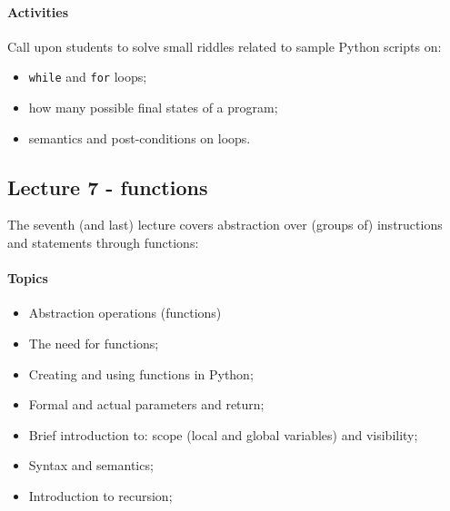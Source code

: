 				\paragraph*{Activities}
					Call upon students to solve small riddles related to sample Python scripts on:

					\begin{itemize}
						\item \texttt{while} and \texttt{for} loops;
						\item how many possible final states of a program;
						\item semantics and post-conditions on loops.
					\end{itemize}

			\subsection{Lecture 7 - functions}
				The seventh (and last)  lecture covers abstraction over (groups of) instructions and statements through functions:

				\paragraph*{Topics}
					\begin{itemize}
						\item Abstraction operations (functions)
						\item The need for functions;
						\item Creating and using functions in Python;
						\item Formal and actual parameters and return;
						\item Brief introduction to: scope (local and global variables) and visibility;
						\item Syntax and semantics;
						\item Introduction to recursion;
					\end{itemize}
